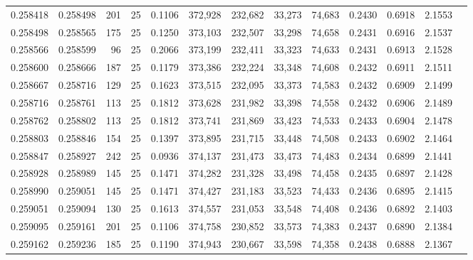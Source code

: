 \begin{tabular}{rrrrrrrrrrrrr}
0.258418 & 0.258498 &   201 &  25 &                                     0.1106 & 372,928 & 232,682 &  33,273 &  74,683 & 0.2430 & 0.6918 & 2.1553 \\
0.258498 & 0.258565 &   175 &  25 &                                     0.1250 & 373,103 & 232,507 &  33,298 &  74,658 & 0.2431 & 0.6916 & 2.1537 \\
0.258566 & 0.258599 &    96 &  25 &                                     0.2066 & 373,199 & 232,411 &  33,323 &  74,633 & 0.2431 & 0.6913 & 2.1528 \\
0.258600 & 0.258666 &   187 &  25 &                                     0.1179 & 373,386 & 232,224 &  33,348 &  74,608 & 0.2432 & 0.6911 & 2.1511 \\
0.258667 & 0.258716 &   129 &  25 &                                     0.1623 & 373,515 & 232,095 &  33,373 &  74,583 & 0.2432 & 0.6909 & 2.1499 \\
0.258716 & 0.258761 &   113 &  25 &                                     0.1812 & 373,628 & 231,982 &  33,398 &  74,558 & 0.2432 & 0.6906 & 2.1489 \\
0.258762 & 0.258802 &   113 &  25 &                                     0.1812 & 373,741 & 231,869 &  33,423 &  74,533 & 0.2433 & 0.6904 & 2.1478 \\
0.258803 & 0.258846 &   154 &  25 &                                     0.1397 & 373,895 & 231,715 &  33,448 &  74,508 & 0.2433 & 0.6902 & 2.1464 \\
0.258847 & 0.258927 &   242 &  25 &                                     0.0936 & 374,137 & 231,473 &  33,473 &  74,483 & 0.2434 & 0.6899 & 2.1441 \\
0.258928 & 0.258989 &   145 &  25 &                                     0.1471 & 374,282 & 231,328 &  33,498 &  74,458 & 0.2435 & 0.6897 & 2.1428 \\
0.258990 & 0.259051 &   145 &  25 &                                     0.1471 & 374,427 & 231,183 &  33,523 &  74,433 & 0.2436 & 0.6895 & 2.1415 \\
0.259051 & 0.259094 &   130 &  25 &                                     0.1613 & 374,557 & 231,053 &  33,548 &  74,408 & 0.2436 & 0.6892 & 2.1403 \\
0.259095 & 0.259161 &   201 &  25 &                                     0.1106 & 374,758 & 230,852 &  33,573 &  74,383 & 0.2437 & 0.6890 & 2.1384 \\
0.259162 & 0.259236 &   185 &  25 &                                     0.1190 & 374,943 & 230,667 &  33,598 &  74,358 & 0.2438 & 0.6888 & 2.1367 \\

\end{tabular}
